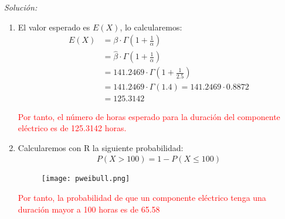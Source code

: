 \documentclass[12pt]{article}
\newenvironment{sol}
    {\emph{Solución:}
    }
    {
    }
\begin{document}
\begin{sol}
\begin{enumerate}[label=\alph*)]
\pagebreak

\item El valor esperado es $E(X)$, lo calcularemos:
\begin{align*}
E(X) &= \beta \cdot \Gamma(1+\frac{1}{\alpha})\\
 &= \hat{\beta} \cdot \Gamma (1+\frac{1}{\alpha})\\
 &= 141.2469 \cdot \Gamma(1+\frac{1}{2.5}) \\
 &= 141.2469 \cdot \Gamma(1.4) = 141.2469 \cdot 0.8872 \\
 &= 125.3142
\end{align*} 

\textcolor{red}{%
    Por tanto, el número de horas esperado para la duración del componente eléctrico es de 125.3142 horas.  
}

\item Calcularemos con R la siguiente probabilidad:
\begin{align*}
	P(X>100) = 1-P(X\leq 100)
\end{align*}

\begin{figure}[h]  %
    \centering      %
    \texttt{[image: pweibull.png]} 
\end{figure}
\textcolor{red}{%
    Por tanto, la probabilidad de que un componente eléctrico tenga una duración mayor a 100 horas es de 65.58%
}
\end{enumerate}
\end{sol}

\pagebreak
\end{document}
